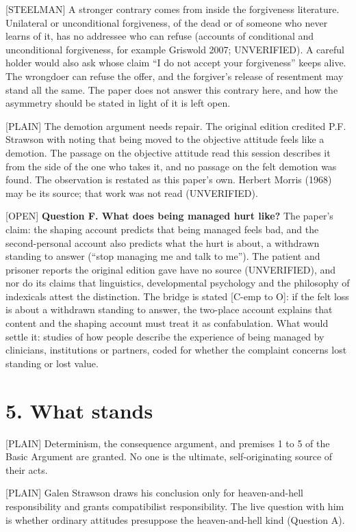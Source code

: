 \documentclass[11pt]{article}
\newcommand{\register}[1]{{\ttfamily\small #1}}
\begin{document}
\register{[STEELMAN]} A stronger contrary comes from inside the forgiveness literature. Unilateral or unconditional forgiveness, of the dead or of someone who never learns of it, has no addressee who can refuse (accounts of conditional and unconditional forgiveness, for example Griswold 2007; UNVERIFIED). A careful holder would also ask whose claim ``I do not accept your forgiveness'' keeps alive. The wrongdoer can refuse the offer, and the forgiver's release of resentment may stand all the same. The paper does not answer this contrary here, and how the asymmetry should be stated in light of it is left open.

\register{[PLAIN]} The demotion argument needs repair. The original edition credited P.F. Strawson with noting that being moved to the objective attitude feels like a demotion. The passage on the objective attitude read this session describes it from the side of the one who takes it, and no passage on the felt demotion was found. The observation is restated as this paper's own. Herbert Morris (1968) may be its source; that work was not read (UNVERIFIED).

\register{[OPEN]} \textbf{Question F. What does being managed hurt like?} The paper's claim: the shaping account predicts that being managed feels bad, and the second-personal account also predicts what the hurt is about, a withdrawn standing to answer (``stop managing me and talk to me''). The patient and prisoner reports the original edition gave have no source (UNVERIFIED), and nor do its claims that linguistics, developmental psychology and the philosophy of indexicals attest the distinction. The bridge is stated [C-emp to O]: if the felt loss is about a withdrawn standing to answer, the two-place account explains that content and the shaping account must treat it as confabulation. What would settle it: studies of how people describe the experience of being managed by clinicians, institutions or partners, coded for whether the complaint concerns lost standing or lost value.

\section*{5. What stands}

\register{[PLAIN]} Determinism, the consequence argument, and premises 1 to 5 of the Basic Argument are granted. No one is the ultimate, self-originating source of their acts.

\register{[PLAIN]} Galen Strawson draws his conclusion only for heaven-and-hell responsibility and grants compatibilist responsibility. The live question with him is whether ordinary attitudes presuppose the heaven-and-hell kind (Question A).
\end{document}
